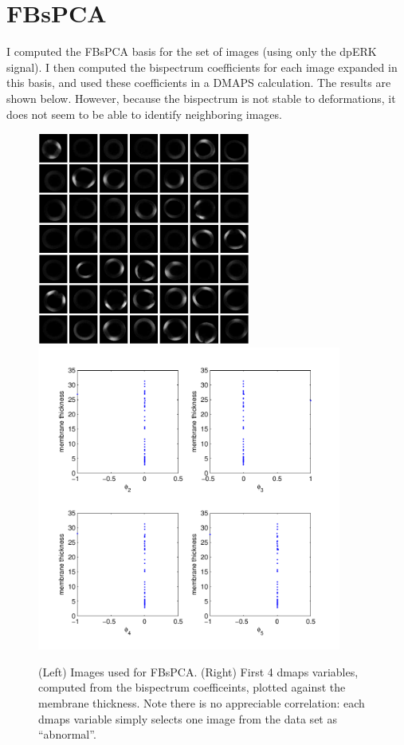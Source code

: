 \documentclass[12pt]{article}
\begin{document}
\section{FBsPCA}

I computed the FBsPCA basis for the set of images (using only the dpERK signal).
%
I then computed the bispectrum coefficients for each image expanded in this basis, and used these coefficients in a DMAPS calculation.
%
The results are shown below.
%
However, because the bispectrum is not stable to deformations, it does not seem to be able to identify neighboring images.


\begin{figure}[H]
\includegraphics[width=7cm]{FBsPCA_images}
\includegraphics[width=10cm]{FBsPCA_dmaps}
\caption{(Left) Images used for FBsPCA. (Right) First 4 dmaps variables, computed from the bispectrum coefficeints, plotted against the membrane thickness. Note there is no appreciable correlation: each dmaps variable simply selects one image from the data set as ``abnormal''.}
\end{figure}






\end{document}

